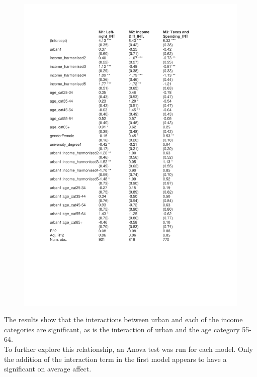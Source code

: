 \documentclass[12pt,letterpaper]{article}
\begin{document}
\begin{figure}
	\centering
	\includegraphics[width=1\linewidth]{tab_a01INT_PDF.doc}
	\caption{}
	\label{fig:taba01intpdf}
\end{figure}

\newpage
\noindent The results show that the interactions between urban and each of the income categories are significant, as is the interaction of urban and the age category 55-64.\\

\noindent To further explore this relationship, an Anova test was run for each model. Only the addition of the interaction term in the first model appears to have a significant on average affect. 
\end{document}
